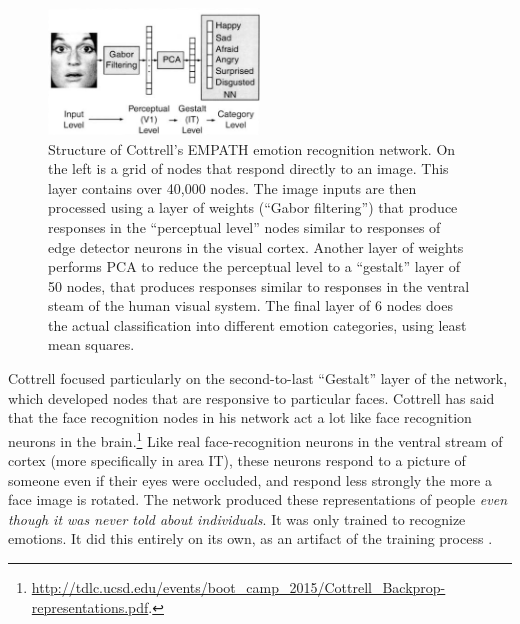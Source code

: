 \begin{figure}[h]
\centering
\includegraphics[width=0.5\textwidth]{images/face_network.png}
\caption[From Adolphs, Cottrell, Dailey and Padgett, 2002  \cite{dailey2002empath}.]{Structure of Cottrell's EMPATH emotion recognition network. On the left is a grid of nodes that respond directly to an image. This layer contains over 40,000 nodes. The image inputs are then processed using a layer of weights (``Gabor filtering'') that produce responses in the ``perceptual level'' nodes similar to responses of edge detector neurons in the visual cortex. Another layer of weights performs PCA to reduce the perceptual level to a ``gestalt'' layer of 50 nodes, that produces responses similar to responses in the ventral steam of the human visual system. The final layer of 6 nodes does the actual classification into different emotion categories, using least mean squares. }
\label{face_net}
\end{figure}

Cottrell focused particularly on the second-to-last ``Gestalt'' layer of the network, which  developed nodes that are responsive to particular faces. Cottrell has said that the face recognition nodes in his network act a lot like face recognition neurons in the brain.\footnote{\url{http://tdlc.ucsd.edu/events/boot_camp_2015/Cottrell_Backprop-representations.pdf}.}  Like real face-recognition neurons in the ventral stream of cortex (more specifically in area IT), these neurons respond to a picture of someone even if their eyes were occluded, and respond less strongly the more a face image is rotated. The network produced these representations of people \emph{even though it was never told about individuals}. It was only trained to recognize emotions. It did this entirely on its own, as an artifact of the training process \cite{dailey2002empath}. 

